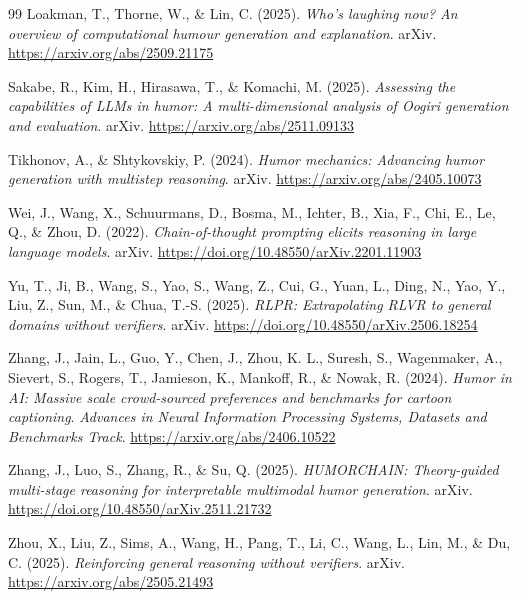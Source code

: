 \documentclass[14pt,a4paper]{extreport}
\begin{document}
\begin{thebibliography}{99}
  Loakman, T., Thorne, W., \& Lin, C. (2025). \textit{Who's laughing now? An overview of computational humour generation and explanation}. arXiv. \href{https://arxiv.org/abs/2509.21175}{https://arxiv.org/abs/2509.21175}

  Sakabe, R., Kim, H., Hirasawa, T., \& Komachi, M. (2025). \textit{Assessing the capabilities of LLMs in humor: A multi-dimensional analysis of Oogiri generation and evaluation}. arXiv. \href{https://arxiv.org/abs/2511.09133}{https://arxiv.org/abs/2511.09133}

  Tikhonov, A., \& Shtykovskiy, P. (2024). \textit{Humor mechanics: Advancing humor generation with multistep reasoning}. arXiv. \href{https://arxiv.org/abs/2405.10073}{https://arxiv.org/abs/2405.10073}

  Wei, J., Wang, X., Schuurmans, D., Bosma, M., Ichter, B., Xia, F., Chi, E., Le, Q., \& Zhou, D. (2022). \textit{Chain-of-thought prompting elicits reasoning in large language models}. arXiv. \href{https://doi.org/10.48550/arXiv.2201.11903}{https://doi.org/10.48550/arXiv.2201.11903}

  Yu, T., Ji, B., Wang, S., Yao, S., Wang, Z., Cui, G., Yuan, L., Ding, N., Yao, Y., Liu, Z., Sun, M., \& Chua, T.-S. (2025). \textit{RLPR: Extrapolating RLVR to general domains without verifiers}. arXiv. \href{https://doi.org/10.48550/arXiv.2506.18254}{https://doi.org/10.48550/arXiv.2506.18254}

  Zhang, J., Jain, L., Guo, Y., Chen, J., Zhou, K. L., Suresh, S., Wagenmaker, A., Sievert, S., Rogers, T., Jamieson, K., Mankoff, R., \& Nowak, R. (2024). \textit{Humor in AI: Massive scale crowd-sourced preferences and benchmarks for cartoon captioning}. \textit{Advances in Neural Information Processing Systems, Datasets and Benchmarks Track}. \href{https://arxiv.org/abs/2406.10522}{https://arxiv.org/abs/2406.10522}

  Zhang, J., Luo, S., Zhang, R., \& Su, Q. (2025). \textit{HUMORCHAIN: Theory-guided multi-stage reasoning for interpretable multimodal humor generation}. arXiv. \href{https://doi.org/10.48550/arXiv.2511.21732}{https://doi.org/10.48550/arXiv.2511.21732}

  Zhou, X., Liu, Z., Sims, A., Wang, H., Pang, T., Li, C., Wang, L., Lin, M., \& Du, C. (2025). \textit{Reinforcing general reasoning without verifiers}. arXiv. \href{https://arxiv.org/abs/2505.21493}{https://arxiv.org/abs/2505.21493}

\end{thebibliography}
\end{document}
